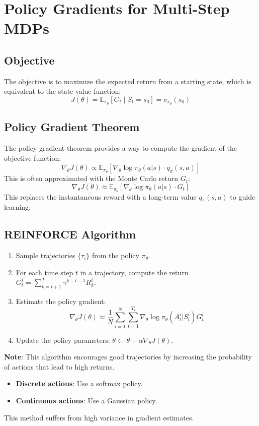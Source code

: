 \documentclass[12pt]{article}
\begin{document}
\section{Policy Gradients for Multi-Step MDPs }

\subsection{Objective}
The objective is to maximize the expected return from a starting state, which is equivalent to the state-value function:
$$ J(\theta) = \mathbb{E}_{\pi_\theta}[G_t \mid S_t = s_0] = v_{\pi_\theta}(s_0) $$

\subsection{Policy Gradient Theorem}
The policy gradient theorem provides a way to compute the gradient of the objective function:
$$ \nabla_\theta J(\theta) \propto \mathbb{E}_{\pi_\theta} \left[ \nabla_\theta \log \pi_\theta(a|s) \cdot q_\pi(s,a) \right] $$
This is often approximated with the Monte Carlo return $G_t$:
$$ \nabla_\theta J(\theta) \approx \mathbb{E}_{\pi_\theta} \left[ \nabla_\theta \log \pi_\theta(a|s) \cdot G_t \right] $$
This replaces the instantaneous reward with a long-term value $q_\pi(s,a)$ to guide learning.

\subsection{REINFORCE Algorithm}
\begin{enumerate}
    \item Sample trajectories $\{\tau_i\}$ from the policy $\pi_\theta$.
    \item For each time step $t$ in a trajectory, compute the return $G_t^i = \sum_{k=t+1}^{T} \gamma^{k-t-1} R_k^i$.
    \item Estimate the policy gradient:
    $$ \nabla_\theta J(\theta) \approx \frac{1}{N} \sum_{i=1}^N \sum_{t=1}^{T_i} \nabla_\theta \log \pi_\theta(A_t^i | S_t^i) G_t^i $$
    \item Update the policy parameters: $\theta \leftarrow \theta + \alpha \nabla_\theta J(\theta)$.
\end{enumerate}
\textbf{Note}: This algorithm encourages good trajectories by increasing the probability of actions that lead to high returns.
\begin{itemize}
    \item \textbf{Discrete actions}: Use a softmax policy.
    \item \textbf{Continuous actions}: Use a Gaussian policy.
\end{itemize}
This method suffers from high variance in gradient estimates.
\end{document}
